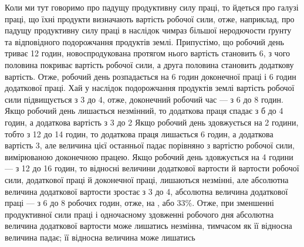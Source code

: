 Коли ми тут говоримо про падущу продуктивну силу праці,
то йдеться про галузі праці, що їхні продукти визначають вартість
робочої сили, отже, наприклад, про падущу продуктивну силу
праці в наслідок чимраз більшої неродючости ґрунту та відповідного
подорожчання продуктів землі. Припустімо, що робочий
день триває 12 годин, новоспродукована протягом нього вартість
становить 6, з чого половина покриває вартість робочої
сили, а друга половина становить додаткову вартість. Отже,
робочий день розпадається на 6 годин доконечної праці і 6 годин
додаткової праці. Хай у наслідок подорожчання продуктів землі
вартість робочої сили підвищується з 3 до 4,
отже, доконечний робочий час — з 6 до 8 годин. Якщо робочий
день лишається незмінний, то додаткова праця спадає з б до 4 годин,
а додаткова вартість з 3 до 2 Якщо робочий день
здовжується на 2 години, тобто з 12 до 14 годин, то додаткова
праця лишається 6 годин, а додаткова вартість 3, але
величина цієї останньої падає порівняно з вартістю робочої сили,
вимірюваною доконечною працею. Якщо робочий день здовжується
на 4 години — з 12 до 16 годин, то відносні величини додаткової
вартости й вартости робочої сили, додаткової праці й
доконечної праці, лишаються незмінні, але абсолютна величина
додаткової вартости зростає з 3 до 4, абсолютна величина
додаткової праці — з 6 до 8 робочих годин, отже, на ,
або 33\%. Отже, при зменшенні продуктивної сили праці
і одночасному здовженні робочого дня абсолютна величина
додаткової вартости може лишатись незмінна, тимчасом як її
відносна величина падає; її відносна величина може лишатись
\parbreak{}  %
